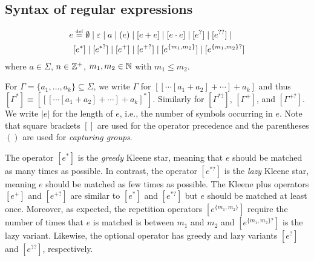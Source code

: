 \subsection{Syntax of regular expressions}

\begin{definition}
	
\[
\begin{split}
e & \eqdef  \emptyset \mid \varepsilon \mid a \mid  (e) \mid %
[e + e] \mid [e \concat e] \mid [e^?] \mid [e^{??}] \mid  \\
 &          [e^*]  \mid [e^{*?}] \mid [e^+] \mid  [e^{+?}] \mid [e^{\{m_1,m_2\}}] \mid [e^{\{m_1,m_2\}?}] 
\end{split}
\]
%	
where $a \in \Sigma$,  $n \in \mathbb{Z}^+$, $m_1,m_2 \in \mathbb{N}$ with $m_1 \le m_2$. 
\end{definition}
%
For $\Gamma = \{a_1, \ldots, a_k\}\subseteq \Sigma$, we write $\Gamma$ for  $[[\cdots [a_1 + a_2] + \cdots] + a_k]$ and thus $[\Gamma^\ast] \equiv [[[\cdots [a_1 + a_2] + \cdots] + a_k]^\ast]$. Similarly for $[\Gamma^{\ast?}]$, $[\Gamma^+]$, and $[\Gamma^{+?}]$. We write $|e|$ for the length of $e$, i.e., the number of symbols occurring in $e$.
%
Note that square brackets $[]$ are used for the operator precedence and the parentheses $()$ are used for \emph{capturing groups}. 
%

The operator $[e^*]$ is the \emph{greedy} Kleene star, meaning that $e$ should be matched as many times as possible. In contrast, the operator $[e^{*?}]$ is the \emph{lazy} Kleene star, meaning $e$ should be matched  as few times as possible. The Kleene plus operators $[e^+]$ and $[e^{+?}]$ are similar to $[e^*]$ and $[e^{*?}]$ but $e$ should be matched at least once. Moreover, as expected,  the repetition operators $[e^{\{m_1,m_2\}}]$ require the number of times that $e$ is matched is between $m_1$ and $m_2$ and $[e^{\{m_1,m_2\}?}]$ is the lazy variant. Likewise, the optional operator has greedy and lazy variants $[e^?]$ and $[e^{??}]$, respectively.

